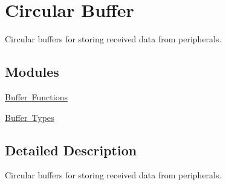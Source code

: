 \hypertarget{group___s_d___buffer}{}\section{Circular Buffer}
\label{group___s_d___buffer}


Circular buffers for storing received data from peripherals.  


\subsection*{Modules}
\begin{DoxyCompactItemize}
\item 
\mbox{\hyperlink{group___s_d___buffer___functions}{Buffer Functions}}
\item 
\mbox{\hyperlink{group___s_d___buffer___types}{Buffer Types}}
\end{DoxyCompactItemize}


\subsection{Detailed Description}
Circular buffers for storing received data from peripherals. 

